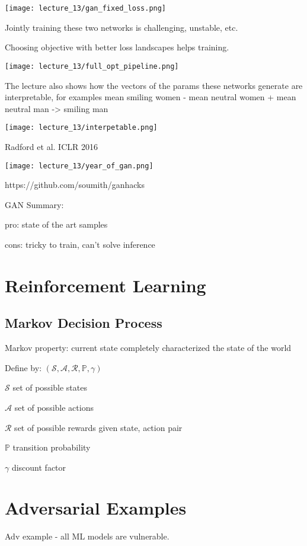 \texttt{[image: lecture\_13/gan\_fixed\_loss.png]}

Jointly training these two networks is challenging, unstable, etc.

Choosing objective with better loss landscapes helps training.

\texttt{[image: lecture\_13/full\_opt\_pipeline.png]}

The lecture also shows how the vectors of the params these networks generate are interpretable, for examples mean smiling women - mean neutral women + mean neutral man -> smiling man

\texttt{[image: lecture\_13/interpetable.png]}

Radford et al. ICLR 2016

\texttt{[image: lecture\_13/year\_of\_gan.png]}

https://github.com/soumith/ganhacks

GAN Summary:

pro: state of the art samples

cons: tricky to train, can't solve inference

\section{Reinforcement Learning }

\subsection{Markov Decision Process}

Markov property: current state completely characterized the state of the world

Define by: $(\mathcal{S,A,R},\mathbb{P},\gamma)$

$\mathcal{S}$ set of possible states

$\mathcal{A}$ set of possible actions

$\mathcal{R}$ set of possible rewards given state, action pair 

$\mathbb{P}$ transition probability

$\gamma$ discount factor

\section{Adversarial Examples}

Adv example - all ML models are vulnerable. 

